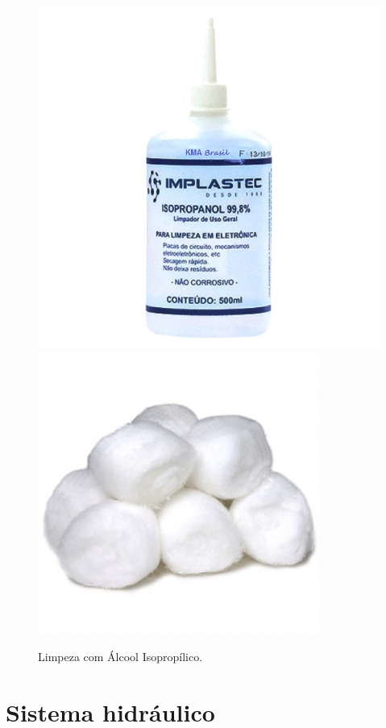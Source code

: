 \begin{itemize}
\begin{figure}[H]
    \includegraphics[scale=0.3]{Figuras/alcool-500ml-1-90045.jpg}
      \includegraphics[scale=0.3]{Figuras/Bolas-de-Algodao.png}
  \caption{Limpeza com Álcool Isopropílico.} 
  \label{fig:alcoo}
\end{figure}

    \end{itemize}

\section*{Sistema hidráulico}

